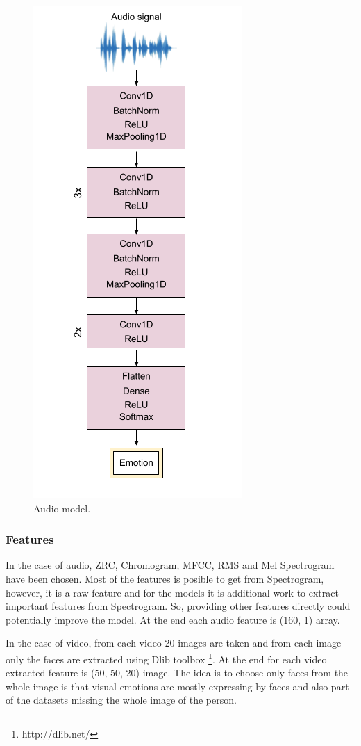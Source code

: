 \documentclass[oneside]{report}
\begin{document}
        \begin{figure}[H]
        \centering
        \includegraphics[scale=0.6]{Audio.png}
        \caption{Audio model.}
        \label{fig:audio}
        \end{figure}
    
    \subsubsection{Features}
    In the case of audio, ZRC, Chromogram, MFCC, RMS and Mel Spectrogram have been chosen. Most of the features is posible to get from Spectrogram, however, it is a raw feature and for the models it is additional work to extract important features from Spectrogram. So, providing other features directly could potentially improve the model. At the end each audio feature is (160, 1) array. 
    
    In the case of video, from each video 20 images are taken and from each image only the faces are extracted using Dlib toolbox \footnote{ http://dlib.net/}.
    At the end for each video extracted feature is (50, 50, 20) image. The idea is to choose only faces from the whole image is that visual emotions are mostly expressing by faces and also part of the datasets missing the whole image of the person. 
    
\end{document}
